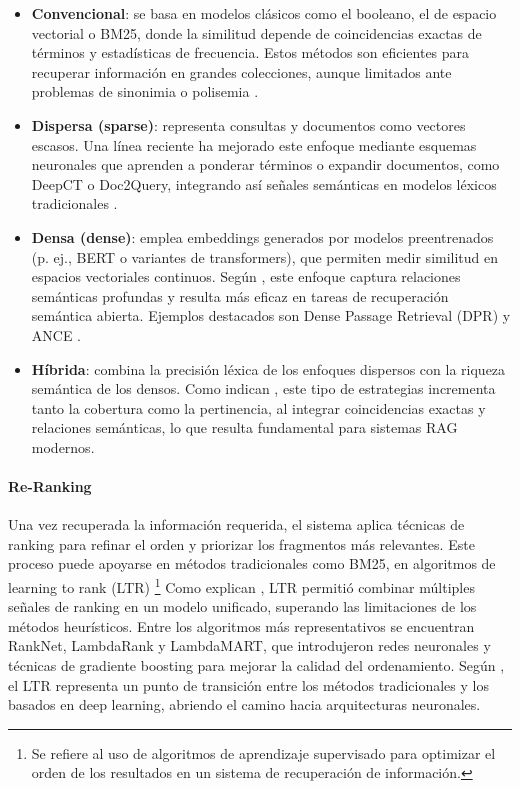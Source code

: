 \begin{itemize}
    \item \textbf{Convencional}: se basa en modelos clásicos como el booleano, el de espacio vectorial o BM25, donde la similitud depende de coincidencias exactas de términos y estadísticas de frecuencia. Estos métodos son eficientes para recuperar información en grandes colecciones, aunque limitados ante problemas de sinonimia o polisemia \parencite{hambarde2023ir}.
    
    \item \textbf{Dispersa (sparse)}: representa consultas y documentos como vectores escasos. Una línea reciente ha mejorado este enfoque mediante esquemas neuronales que aprenden a ponderar términos o expandir documentos, como DeepCT o Doc2Query, integrando así señales semánticas en modelos léxicos tradicionales \parencite{hambarde2023ir,gao2023rag}. 
    
    \item \textbf{Densa (dense)}: emplea embeddings generados por modelos preentrenados (p. ej., BERT o variantes de transformers), que permiten medir similitud en espacios vectoriales continuos. Según \textcite{hu2024ragrau}, este enfoque captura relaciones semánticas profundas y resulta más eficaz en tareas de recuperación semántica abierta. Ejemplos destacados son Dense Passage Retrieval (DPR) y ANCE \parencite{hambarde2023ir}. 
    
    \item \textbf{Híbrida}: combina la precisión léxica de los enfoques dispersos con la riqueza semántica de los densos. Como indican \textcite{zhai2024llmIR}, este tipo de estrategias incrementa tanto la cobertura como la pertinencia, al integrar coincidencias exactas y relaciones semánticas, lo que resulta fundamental para sistemas RAG modernos.
\end{itemize}

\paragraph{Re-Ranking} Una vez recuperada la información requerida, el sistema aplica técnicas de ranking para refinar el orden y priorizar los fragmentos más relevantes.
Este proceso puede apoyarse en métodos tradicionales como BM25, en algoritmos de learning to rank (LTR) \footnote{Se refiere al uso de algoritmos de aprendizaje supervisado para optimizar el orden de los resultados en un sistema de recuperación de información.}
Como explican \textcite{bernard2025fate}, LTR permitió combinar múltiples señales de ranking en un modelo unificado, superando las limitaciones de los métodos
heurísticos. Entre los algoritmos más representativos se encuentran RankNet, LambdaRank y LambdaMART, que introdujeron redes neuronales y técnicas de gradiente 
boosting para mejorar la calidad del ordenamiento. Según \textcite{hambarde2023ir}, el LTR representa un punto de transición entre los métodos tradicionales y los basados en 
deep learning, abriendo el camino hacia arquitecturas neuronales.

